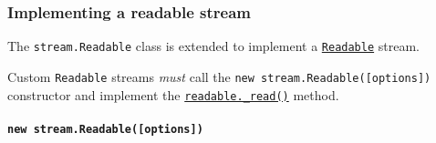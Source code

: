 \subsubsection{Implementing a readable
stream}\label{implementing-a-readable-stream}

The \texttt{stream.Readable} class is extended to implement a
\hyperref[class-streamreadable]{\texttt{Readable}} stream.

Custom \texttt{Readable} streams \emph{must} call the
\texttt{new\ stream.Readable({[}options{]})} constructor and implement
the \hyperref[readable_readsize]{\texttt{readable.\_read()}} method.

\paragraph{\texorpdfstring{\texttt{new\ stream.Readable({[}options{]})}}{new stream.Readable({[}options{]})}}\label{new-stream.readableoptions}

